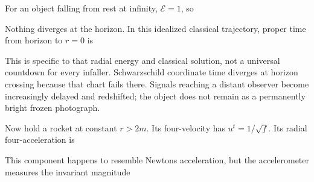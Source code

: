 \documentclass[
  11pt,
  letterpaper,
  oneside,
  openany]{scrbook}
\begin{document}
For an object falling from rest at infinity, \(\mathcal E=1\), so

\begin{center}
\begingroup
{}
\ifdim\wd\grmathbox>\linewidth
\resizebox{\linewidth}{!}{\usebox{\grmathbox}}
\else\usebox{\grmathbox}\fi
\endgroup
\end{center}

Nothing diverges at the horizon. In this idealized classical trajectory,
proper time from horizon to \(r=0\) is

\begin{center}
\begingroup
{}
\ifdim\wd\grmathbox>\linewidth
\resizebox{\linewidth}{!}{\usebox{\grmathbox}}
\else\usebox{\grmathbox}\fi
\endgroup
\end{center}

This is specific to that radial energy and classical solution, not a
universal countdown for every infaller. Schwarzschild coordinate time
diverges at horizon crossing because that chart fails there. Signals
reaching a distant observer become increasingly delayed and redshifted;
the object does not remain as a permanently bright frozen photograph.

Now hold a rocket at constant \(r>2m\). Its four-velocity has
\(u^t=1/\sqrt f\). Its radial four-acceleration is

\begin{center}
\begingroup
{}
\ifdim\wd\grmathbox>\linewidth
\resizebox{\linewidth}{!}{\usebox{\grmathbox}}
\else\usebox{\grmathbox}\fi
\endgroup
\end{center}

This component happens to resemble Newton\textquotesingle s
acceleration, but the accelerometer measures the invariant magnitude

\begin{center}
\begingroup
{}
\ifdim\wd\grmathbox>\linewidth
\resizebox{\linewidth}{!}{\usebox{\grmathbox}}
\else\usebox{\grmathbox}\fi
\endgroup
\end{center}
\end{document}
